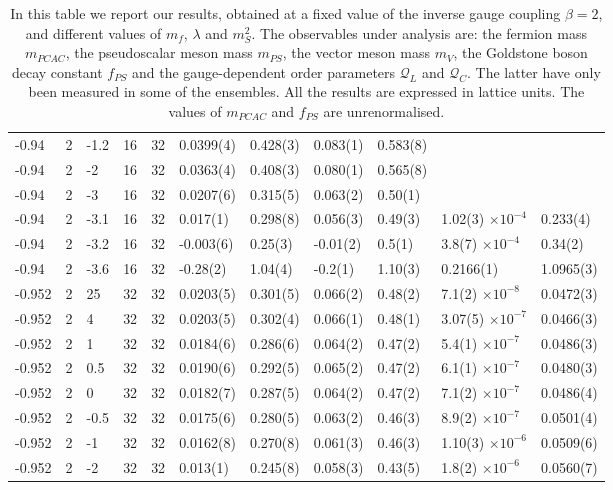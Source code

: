 \begin{table}
\begin{adjustwidth}{-4em}{-4em}
\begin{tabular}{l  l l l l l l l l l l}
  -0.94 & 2 & -1.2 & 16 & 32 & 0.0399(4) & 0.428(3) & 0.083(1) & 0.583(8)\\
  -0.94 & 2 & -2 & 16 & 32 & 0.0363(4) & 0.408(3) & 0.080(1) & 0.565(8)\\
  -0.94 & 2 & -3 & 16 & 32 & 0.0207(6) & 0.315(5) & 0.063(2) & 0.50(1)\\
  -0.94 & 2 & -3.1 & 16 & 32 & 0.017(1) & 0.298(8) & 0.056(3) & 0.49(3) & 1.02(3) $\times 10^{-4}$ & 0.233(4)\\
  -0.94 & 2 & -3.2 & 16 & 32 & -0.003(6) & 0.25(3) & -0.01(2) & 0.5(1) & 3.8(7) $\times 10^{-4}$ & 0.34(2)\\
  -0.94 & 2 & -3.6 & 16 & 32 & -0.28(2) & 1.04(4) & -0.2(1) & 1.10(3) & 0.2166(1) & 1.0965(3)\\
  \midrule
  -0.952 & 2 & 25 & 32 & 32 & 0.0203(5) & 0.301(5) & 0.066(2) & 0.48(2) & 7.1(2) $\times 10^{-8}$ & 0.0472(3)\\
  -0.952 & 2 & 4 & 32 & 32 & 0.0203(5) & 0.302(4) & 0.066(1) & 0.48(1) & 3.07(5) $\times 10^{-7}$ & 0.0466(3)\\
  -0.952 & 2 & 1 & 32 & 32 & 0.0184(6) & 0.286(6) & 0.064(2) & 0.47(2) & 5.4(1) $\times 10^{-7}$ & 0.0486(3)\\
  -0.952 & 2 & 0.5 & 32 & 32 & 0.0190(6) & 0.292(5) & 0.065(2) & 0.47(2) & 6.1(1) $\times 10^{-7}$ & 0.0480(3) \\
  -0.952 & 2 & 0 & 32 & 32 & 0.0182(7) & 0.287(5) & 0.064(2) & 0.47(2) &  7.1(2) $\times 10^{-7}$ & 0.0486(4)\\
  -0.952 & 2 & -0.5 & 32 & 32 & 0.0175(6) & 0.280(5) & 0.063(2) & 0.46(3) & 8.9(2) $\times 10^{-7}$ & 0.0501(4)\\
  -0.952 & 2 & -1 & 32 & 32 & 0.0162(8) & 0.270(8) & 0.061(3) & 0.46(3) & 1.10(3) $\times 10^{-6}$ & 0.0509(6)\\
  -0.952 & 2 & -2 & 32 & 32  & 0.013(1) & 0.245(8) & 0.058(3) & 0.43(5) & 1.8(2) $\times 10^{-6}$ & 0.0560(7)\\
  \bottomrule
  \end{tabular}
  \end{adjustwidth}
  \caption{In this table we report our results, obtained at a fixed value of the inverse gauge coupling $\beta = 2$, and different values of $m_f$, $\lambda$ and $m_S^2$. The observables under analysis are: the fermion mass $m_{PCAC}$, the pseudoscalar meson mass $m_{PS}$, the vector meson mass $m_V$, the Goldstone boson decay constant $f_{PS}$ and the gauge-dependent order parameters $\mathcal Q_L$ and $\mathcal Q_C$. The latter have only been measured in some of the ensembles. All the results are expressed in lattice units. The values of $m_{PCAC}$ and $f_{PS}$ are unrenormalised.}
  \label{data}
  \end{table}
  


